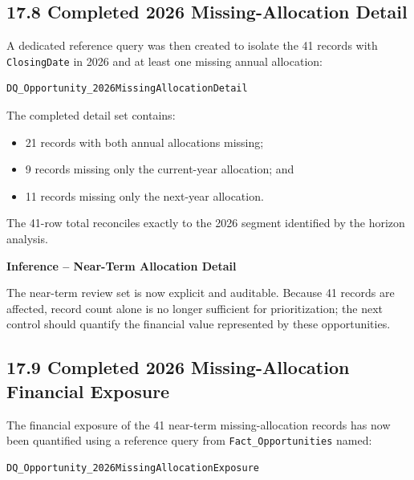 \documentclass[11pt,a4paper]{article}
\begin{document}
\subsection{17.8 Completed 2026 Missing-Allocation Detail}

A dedicated reference query was then created to isolate the 41 records with
\texttt{ClosingDate} in 2026 and at least one missing annual allocation:

\begin{lstlisting}[style=powerquery]
DQ_Opportunity_2026MissingAllocationDetail
\end{lstlisting}

The completed detail set contains:

\begin{itemize}[leftmargin=7mm,itemsep=2pt]
    \item 21 records with both annual allocations missing;
    \item 9 records missing only the current-year allocation; and
    \item 11 records missing only the next-year allocation.
\end{itemize}

The 41-row total reconciles exactly to the 2026 segment identified by the
horizon analysis.

\begin{inferencebox}

\textbf{Inference -- Near-Term Allocation Detail}

The near-term review set is now explicit and auditable. Because 41 records are
affected, record count alone is no longer sufficient for prioritization; the
next control should quantify the financial value represented by these
opportunities.

\end{inferencebox}

\subsection{17.9 Completed 2026 Missing-Allocation Financial Exposure}

The financial exposure of the 41 near-term missing-allocation records has now
been quantified using a reference query from \texttt{Fact\_Opportunities} named:

\begin{lstlisting}[style=powerquery]
DQ_Opportunity_2026MissingAllocationExposure
\end{lstlisting}
\end{document}
